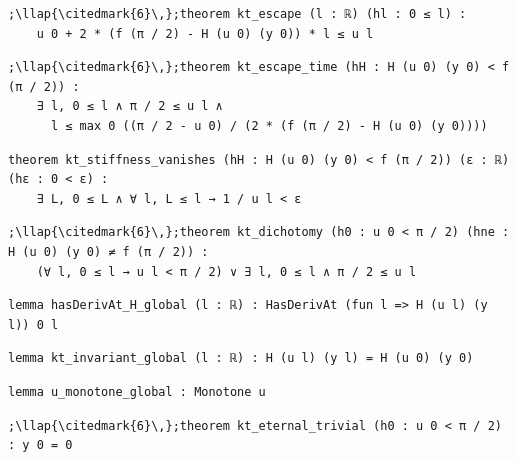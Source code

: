 \begin{lstlisting}[style=leancat]
;\llap{\citedmark{6}\,};theorem kt_escape (l : ℝ) (hl : 0 ≤ l) :
    u 0 + 2 * (f (π / 2) - H (u 0) (y 0)) * l ≤ u l
\end{lstlisting}

\begin{lstlisting}[style=leancat]
;\llap{\citedmark{6}\,};theorem kt_escape_time (hH : H (u 0) (y 0) < f (π / 2)) :
    ∃ l, 0 ≤ l ∧ π / 2 ≤ u l ∧
      l ≤ max 0 ((π / 2 - u 0) / (2 * (f (π / 2) - H (u 0) (y 0))))
\end{lstlisting}

\begin{lstlisting}[style=leancat]
theorem kt_stiffness_vanishes (hH : H (u 0) (y 0) < f (π / 2)) (ε : ℝ) (hε : 0 < ε) :
    ∃ L, 0 ≤ L ∧ ∀ l, L ≤ l → 1 / u l < ε
\end{lstlisting}

\begin{lstlisting}[style=leancat]
;\llap{\citedmark{6}\,};theorem kt_dichotomy (h0 : u 0 < π / 2) (hne : H (u 0) (y 0) ≠ f (π / 2)) :
    (∀ l, 0 ≤ l → u l < π / 2) ∨ ∃ l, 0 ≤ l ∧ π / 2 ≤ u l
\end{lstlisting}

\begin{lstlisting}[style=leancat]
lemma hasDerivAt_H_global (l : ℝ) : HasDerivAt (fun l => H (u l) (y l)) 0 l
\end{lstlisting}

\begin{lstlisting}[style=leancat]
lemma kt_invariant_global (l : ℝ) : H (u l) (y l) = H (u 0) (y 0)
\end{lstlisting}

\begin{lstlisting}[style=leancat]
lemma u_monotone_global : Monotone u
\end{lstlisting}

\begin{lstlisting}[style=leancat]
;\llap{\citedmark{6}\,};theorem kt_eternal_trivial (h0 : u 0 < π / 2) : y 0 = 0
\end{lstlisting}

